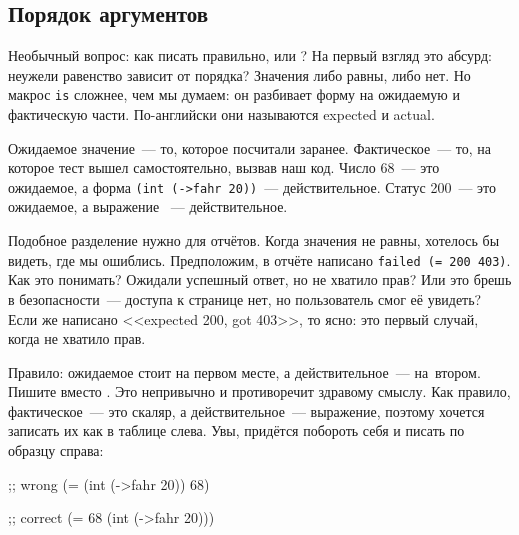 \subsection{Порядок аргументов}


Необычный вопрос: как писать правильно,  или
? На первый взгляд это абсурд: неужели равенство
зависит от порядка? Значения либо равны, либо нет. Но макрос \verb|is|
сложнее, чем мы думаем: он разбивает форму  на ожидаемую
и фактическую части. По-английски они называются expected и actual.

Ожидаемое значение~--- то, которое посчитали заранее. Фактическое~--- то, на
которое тест вышел самостоятельно, вызвав наш код. Число 68~--- это ожидаемое, а
форма \verb|(int (->fahr 20))|~--- действительное. Статус 200~--- это ожидаемое,
а выражение ~--- действительное.

Подобное разделение нужно для отчётов. Когда значения не равны, хотелось бы
видеть, где мы ошиблись. Предположим, в отчёте написано
\verb|failed (= 200 403)|. Как это понимать? Ожидали успешный ответ, но не
хватило прав? Или это брешь в безопасности~--- доступа к странице нет, но
пользователь смог её увидеть? Если же написано <<expected 200, got 403>>, то
ясно: это первый случай, когда не хватило прав.

Правило: ожидаемое стоит на первом месте, а действительное~--- на~втором. Пишите
 вместо . Это непривычно
и противоречит здравому смыслу. Как правило, фактическое~--- это скаляр, а
действительное~--- выражение, поэтому хочется записать их как в таблице слева.
Увы, придётся побороть себя и писать по образцу справа:

\ifnarrow

\begin{english}
  \begin{clojure}
;; wrong
(= (int (->fahr 20)) 68)
  \end{clojure}

\splitter

  \begin{clojure}
;; correct
(= 68 (int (->fahr 20)))
  \end{clojure}
\end{english}

\else


